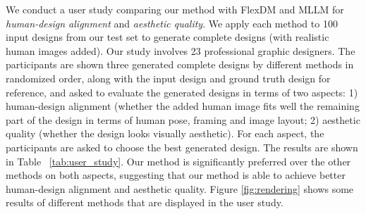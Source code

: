 We conduct a user study comparing our method with FlexDM and MLLM for \textit{human-design alignment} and \textit{aesthetic quality}. We apply each method to 100 input designs from our test set to generate complete designs (with realistic human images added). Our study involves 23 professional graphic designers. The participants are shown three generated complete designs by different methods in randomized order, along with the input design and ground truth design for reference, and asked to evaluate the generated designs in terms of two aspects: 1) human-design alignment (whether the added human image fits well the remaining part of the design in terms of human pose, framing and image layout; 2) aesthetic quality (whether the design looks visually aesthetic). For each aspect, the participants are asked to choose the best generated design. The results are shown in Table ~\ref{tab:user_study}. Our method is significantly preferred over the other methods on both aspects, suggesting that our method is able to achieve better human-design alignment and aesthetic quality. Figure \ref{fig:rendering} shows some results of different methods that are displayed in the user study.